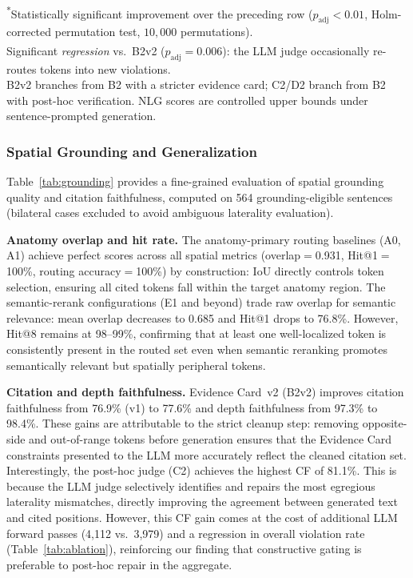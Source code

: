 \begin{table}[t]
\vspace{4pt}
{\footnotesize\raggedright
\textsuperscript{*}Statistically significant improvement over the preceding row ($p_{\mathrm{adj}}{<}0.01$, Holm-corrected permutation test, $10{,}000$ permutations).\\
\textsuperscript{\dag}Significant \emph{regression} vs.\ B2\textquotesingle v2 ($p_{\mathrm{adj}}{=}0.006$): the LLM judge occasionally re-routes tokens into new violations.\\
B2\textquotesingle v2 branches from B2\textquotesingle{} with a stricter evidence card; C2\textquotesingle/D2 branch from B2\textquotesingle{} with post-hoc verification.
NLG scores are controlled upper bounds under sentence-prompted generation.\par
}
\end{table}


\subsubsection{Spatial Grounding and Generalization}
\label{sec:grounding}

Table~\ref{tab:grounding} provides a fine-grained evaluation of spatial grounding quality and citation faithfulness, computed on 564 grounding-eligible sentences (bilateral cases excluded to avoid ambiguous laterality evaluation).

\noindent\textbf{Anatomy overlap and hit rate.}
The anatomy-primary routing baselines (A0, A1) achieve perfect scores across all spatial metrics (overlap$=$0.931, Hit@1$=$100\%, routing accuracy$=$100\%) by construction: IoU directly controls token selection, ensuring all cited tokens fall within the target anatomy region.
The semantic-rerank configurations (E1 and beyond) trade raw overlap for semantic relevance: mean overlap decreases to 0.685 and Hit@1 drops to 76.8\%.
However, Hit@8 remains at 98--99\%, confirming that at least one well-localized token is consistently present in the routed set even when semantic reranking promotes semantically relevant but spatially peripheral tokens.

\noindent\textbf{Citation and depth faithfulness.}
Evidence Card~v2 (B2\textquotesingle v2) improves citation faithfulness from 76.9\% (v1) to 77.6\% and depth faithfulness from 97.3\% to 98.4\%.
These gains are attributable to the strict cleanup step: removing opposite-side and out-of-range tokens before generation ensures that the Evidence Card constraints presented to the LLM more accurately reflect the cleaned citation set.
Interestingly, the post-hoc judge (C2\textquotesingle) achieves the highest CF of 81.1\%.
This is because the LLM judge selectively identifies and repairs the most egregious laterality mismatches, directly improving the agreement between generated text and cited positions.
However, this CF gain comes at the cost of additional LLM forward passes (4{,}112 vs.\ 3{,}979) and a regression in overall violation rate (Table~\ref{tab:ablation}), reinforcing our finding that constructive gating is preferable to post-hoc repair in the aggregate.

